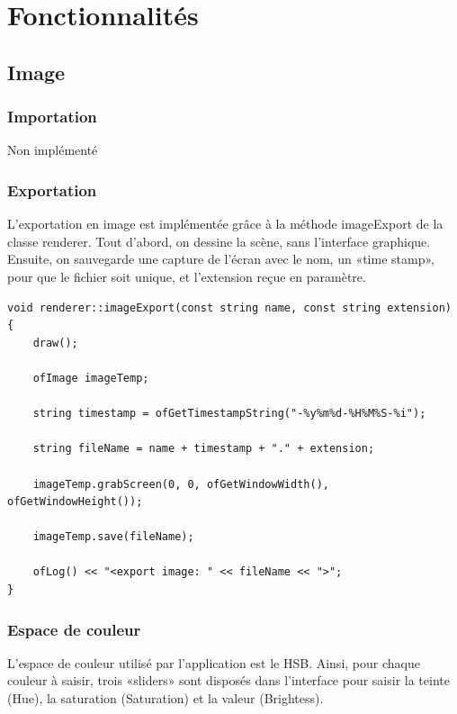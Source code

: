 \newcommand\tab[1][1cm]{\hspace*{#1}}

\chapter{Fonctionnalités}
\label{s:fonctionnalite}

\section{Image}
\subsection{Importation}
Non implémenté

\subsection{Exportation}
L'exportation en image est implémentée grâce à la méthode imageExport de la classe renderer. Tout d’abord, on dessine la scène, sans l’interface graphique. Ensuite, on sauvegarde une capture de l’écran avec le nom, un «time stamp», pour que le fichier soit unique, et l’extension reçue en paramètre.\\

\begin{lstlisting}
void renderer::imageExport(const string name, const string extension)
{
	draw();
	
	ofImage imageTemp;
	
	string timestamp = ofGetTimestampString("-%y%m%d-%H%M%S-%i");
	
	string fileName = name + timestamp + "." + extension;
	
	imageTemp.grabScreen(0, 0, ofGetWindowWidth(), ofGetWindowHeight());
	
	imageTemp.save(fileName);
	
	ofLog() << "<export image: " << fileName << ">";
}
\end{lstlisting}


\subsection{Espace de couleur}
 L'espace de couleur utilisé par l'application est le HSB. Ainsi, pour chaque couleur à saisir, trois «sliders» sont disposés dans l'interface pour saisir la teinte (Hue), la saturation (Saturation) et la valeur (Brightess).\\
 
